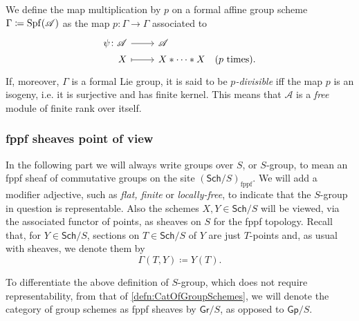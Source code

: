 \begin{defn}\label{defn:pDivisibleFormalLieGroup}
	We define the map multiplication by $p$ on a formal affine
	group scheme $\Gamma \coloneqq \operatorname{Spf}(\mathscr{A})$
	as the map $p\colon \Gamma \to \Gamma$
	associated to 
	\begin{equation*}
	\begin{tikzcd}[row sep = 0ex
		,/tikz/column 1/.append style={anchor=base east}
		,/tikz/column 2/.append style={anchor=base west}]
		\psi\colon \mathscr{A} \arrow[r, "", rightarrow] &
		\mathscr{A} \\ %
		X \arrow[r, "", mapsto] & 
		X \ast \cdots \ast X
	\quad \text{($p$ times)}
	.\end{tikzcd}
	\end{equation*} 
	If, moreover, $\Gamma$ is a formal Lie group, 
	it is said to be \emph{$p$-divisible} iff the map $p$ is 
	an isogeny, i.e. it is surjective and has finite kernel.
	This means that $\mathscr{A}$ is a \emph{free} module of finite rank over itself.
\end{defn}



\subsubsection{fppf sheaves point of view}
In the following part we will always write groups over $S$, or $S$-group, to mean
an fppf sheaf of commutative groups on the site $(\mathsf{Sch}/S)_{\mathrm{fppf}}$.
We will add a modifier adjective, such as \emph{flat, finite} or \emph{locally-free},
to indicate that the \(S\)-group in question is representable.
Also the schemes $X, Y \in \mathsf{Sch}/S$ will be viewed, via the associated
functor of points, as sheaves on $S$ for the fppf topology.
Recall that, for $Y \in \mathsf{Sch}/S$, sections on
$T \in \mathsf{Sch}/S$ of $Y$ are just $T$-points and,
as usual with sheaves, we denote them by
\begin{equation*}
	\Gamma \left( T, Y \right) \coloneqq Y(T)
.\end{equation*}


\begin{ntt}[]\label{not:GrS} 
	To differentiate the above definition of $S$-group,
	which does not require representability, from that of \cref{defn:CatOfGroupSchemes}, we will
	denote the category of group schemes as fppf sheaves by $\mathsf{Gr}/S$,
	as opposed to $\mathsf{Gp}/S$.
\end{ntt}


